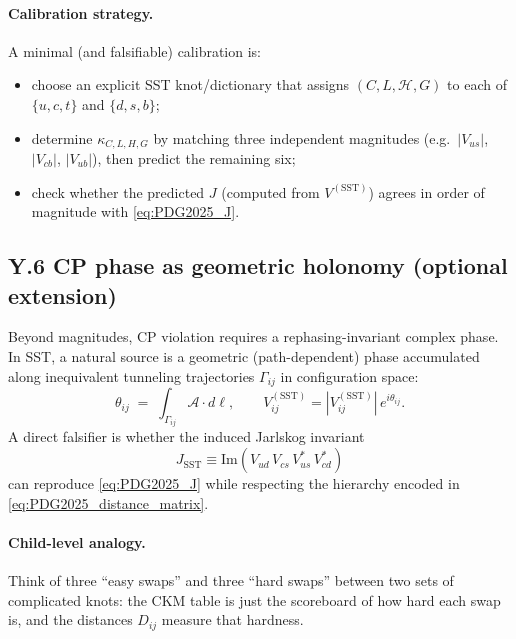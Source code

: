 \documentclass[10pt]{article}
\begin{document}
        \paragraph{Calibration strategy.}
            A minimal (and falsifiable) calibration is:
            \begin{itemize}
                \item choose an explicit SST knot/dictionary that assigns $(C,L,\mathcal{H},G)$ to each of
                $\{u,c,t\}$ and $\{d,s,b\}$;
                \item determine $\kappa_{C,L,H,G}$ by matching three independent magnitudes
                (e.g.\ $|V_{us}|$, $|V_{cb}|$, $|V_{ub}|$), then predict the remaining six;
                \item check whether the predicted $J$ (computed from $V^{(\text{SST})}$) agrees in order of magnitude with \eqref{eq:PDG2025_J}.
            \end{itemize}

    \subsection*{Y.6 CP phase as geometric holonomy (optional extension)}

    Beyond magnitudes, CP violation requires a rephasing-invariant complex phase.
    In SST, a natural source is a geometric (path-dependent) phase accumulated along inequivalent
    tunneling trajectories $\Gamma_{ij}$ in configuration space:
    \begin{equation}
        \theta_{ij} \;=\; \int_{\Gamma_{ij}} \mathcal{A}\cdot d\ell,
        \qquad
        V^{(\text{SST})}_{ij} = |V^{(\text{SST})}_{ij}|\,e^{i\theta_{ij}}.
        \label{eq:SST_holonomy_phase}
    \end{equation}
    A direct falsifier is whether the induced Jarlskog invariant
    \begin{equation}
        J_{\text{SST}}
        \equiv
        \mathrm{Im}\!\left(
                         V_{ud}\,V_{cs}\,V_{us}^\ast\,V_{cd}^\ast
        \right)
        \label{eq:SST_Jarlskog}
    \end{equation}
    can reproduce \eqref{eq:PDG2025_J} while respecting the hierarchy encoded in \eqref{eq:PDG2025_distance_matrix}.

    \paragraph{Child-level analogy.}
        Think of three ``easy swaps'' and three ``hard swaps'' between two sets of complicated knots:
        the CKM table is just the scoreboard of how hard each swap is, and the distances $D_{ij}$ measure that hardness.
\end{document}
